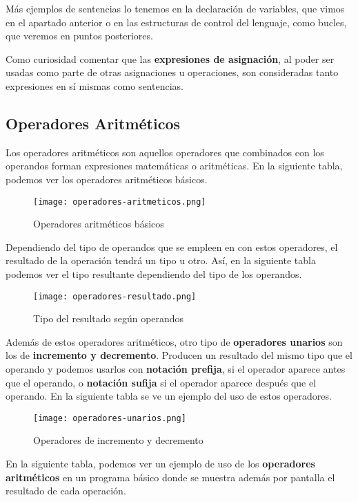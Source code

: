 Más ejemplos de sentencias lo tenemos en la declaración de variables, que vimos en el apartado anterior o en las estructuras de control del lenguaje, como bucles, que veremos en puntos posteriores.

Como curiosidad comentar que las \textbf{expresiones de asignación}, al poder ser usadas como parte de otras asignaciones u operaciones, son consideradas tanto expresiones en sí mismas como sentencias.

\subsection{Operadores Aritméticos}
Los operadores aritméticos son aquellos operadores que combinados con los operandos forman expresiones matemáticas o aritméticas. En la siguiente tabla, podemos ver los operadores aritméticos básicos.

\begin{figure}[H]
    \centering
    \texttt{[image: operadores-aritmeticos.png]}
    \caption{Operadores aritméticos básicos}
\end{figure}

Dependiendo del tipo de operandos que se empleen en con estos operadores, el resultado de la operación tendrá un tipo u otro. Así, en la siguiente tabla podemos ver el tipo resultante dependiendo del tipo de los operandos.

\begin{figure}[H]
    \centering
    \texttt{[image: operadores-resultado.png]}
    \caption{Tipo del resultado según operandos}
\end{figure}

Además de estos operadores aritméticos, otro tipo de \textbf{operadores unarios} son los de \textbf{incremento y decremento}. Producen un resultado del mismo tipo que el operando y podemos usarlos con \textbf{notación prefija}, si el operador aparece antes que el operando, o \textbf{notación sufija} si el operador aparece después que el operando. En la siguiente tabla se ve un ejemplo del uso de estos operadores.

\begin{figure}[H]
    \centering
    \texttt{[image: operadores-unarios.png]}
    \caption{Operadores de incremento y decremento}
\end{figure}

En la siguiente tabla, podemos ver un ejemplo de uso de los \textbf{operadores aritméticos} en un programa básico donde se muestra además por pantalla el resultado de cada operación.

